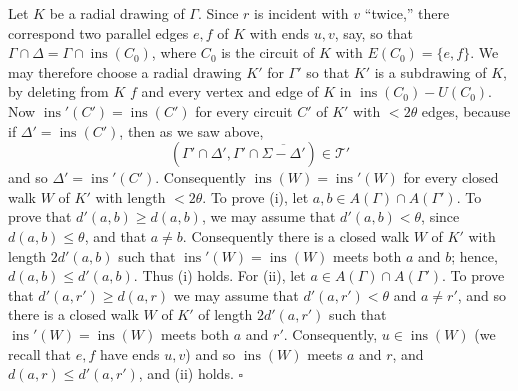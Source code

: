 Let $K$ be a radial drawing of $\Gamma$. Since $r$ is incident with $v$ ``twice,'' there correspond two parallel edges $e, f$ of $K$ with ends $u, v$, say, so that $\Gamma \cap \Delta = \Gamma \cap \operatorname{ins}(C_0)$, where $C_0$ is the circuit of $K$ with $E(C_0) = \{e, f\}$. We may therefore choose a radial drawing $K'$ for $\Gamma'$ so that $K'$ is a subdrawing of $K$, by deleting from $K$ $f$ and every vertex and edge of $K$ in $\operatorname{ins}(C_0) - U(C_0)$. Now $\operatorname{ins}'(C') = \operatorname{ins}(C')$ for every circuit $C'$ of $K'$ with $<2\theta$ edges, because if $\Delta' = \operatorname{ins}(C')$, then as we saw above,
\begin{equation*}
(\Gamma' \cap \Delta', \Gamma' \cap \overline{\Sigma - \Delta'}) \in \mathscr{T}'
\end{equation*}
and so $\Delta' = \operatorname{ins}'(C')$. Consequently $\operatorname{ins}(W) = \operatorname{ins}'(W)$ for every closed walk $W$ of $K'$ with length $<2\theta$. To prove (i), let $a, b \in A(\Gamma) \cap A(\Gamma')$. To prove that $d'(a, b) \ge d(a, b)$, we may assume that $d'(a, b) < \theta$, since $d(a, b) \le \theta$, and that $a \ne b$. Consequently there is a closed walk $W$ of $K'$ with length $2d'(a, b)$ such that $\operatorname{ins}'(W) = \operatorname{ins}(W)$ meets both $a$ and $b$; hence, $d(a, b) \le d'(a, b)$. Thus (i) holds. For (ii), let $a \in A(\Gamma) \cap A(\Gamma')$. To prove that $d'(a, r') \ge d(a, r)$ we may assume that $d'(a, r') < \theta$ and $a \ne r'$, and so there is a closed walk $W$ of $K'$ of length $2d'(a, r')$ such that $\operatorname{ins}'(W) = \operatorname{ins}(W)$ meets both $a$ and $r'$. Consequently, $u \in \operatorname{ins}(W)$ (we recall that $e, f$ have ends $u, v$) and so $\operatorname{ins}(W)$ meets $a$ and $r$, and $d(a, r) \le d'(a, r')$, and (ii) holds. $\square$
